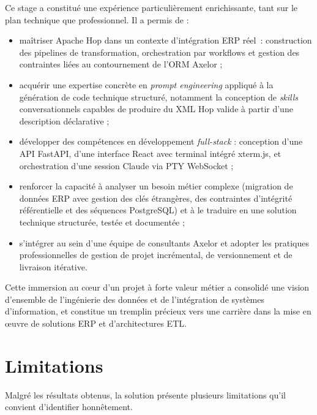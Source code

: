 Ce stage a constitué une expérience particulièrement enrichissante, tant sur le plan technique que professionnel.
Il a permis de :

\begin{itemize}
  \item maîtriser Apache Hop dans un contexte d'intégration ERP réel~: construction des pipelines de transformation, orchestration par workflows et gestion des contraintes liées au contournement de l'ORM Axelor ;
  \item acquérir une expertise concrète en \textit{prompt engineering} appliqué à la génération de code technique structuré, notamment la conception de \textit{skills} conversationnels capables de produire du XML Hop valide à partir d'une description déclarative ;
  \item développer des compétences en développement \textit{full-stack} : conception d'une API FastAPI, d'une interface React avec terminal intégré xterm.js, et orchestration d'une session Claude via PTY WebSocket ;
  \item renforcer la capacité à analyser un besoin métier complexe (migration de données ERP avec gestion des clés étrangères, des contraintes d'intégrité référentielle et des séquences PostgreSQL) et à le traduire en une solution technique structurée, testée et documentée ;
  \item s'intégrer au sein d'une équipe de consultants Axelor et adopter les pratiques professionnelles de gestion de projet incrémental, de versionnement et de livraison itérative.
\end{itemize}

Cette immersion au c\oe{}ur d'un projet à forte valeur métier a consolidé une vision d'ensemble de l'ingénierie des données et de l'intégration de systèmes d'information, et constitue un tremplin précieux vers une carrière dans la mise en \oe{}uvre de solutions ERP et d'architectures ETL.

\section*{Limitations}

Malgré les résultats obtenus, la solution présente plusieurs limitations qu'il convient d'identifier honnêtement.

